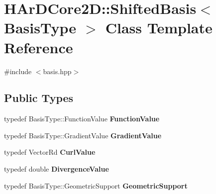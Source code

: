 \hypertarget{classHArDCore2D_1_1ShiftedBasis}{}\section{H\+Ar\+D\+Core2D\+:\+:Shifted\+Basis$<$ Basis\+Type $>$ Class Template Reference}
\label{classHArDCore2D_1_1ShiftedBasis}


{\ttfamily \#include $<$basis.\+hpp$>$}

\subsection*{Public Types}
\begin{DoxyCompactItemize}
\item 
\mbox{\label{classHArDCore2D_1_1ShiftedBasis_a723910be19a99d8ce0273b83b8f5e867}} 
typedef Basis\+Type\+::\+Function\+Value {\bfseries Function\+Value}
\item 
\mbox{\label{classHArDCore2D_1_1ShiftedBasis_a8c735f6905189f7c0e959a4758d9ff4b}} 
typedef Basis\+Type\+::\+Gradient\+Value {\bfseries Gradient\+Value}
\item 
\mbox{\label{classHArDCore2D_1_1ShiftedBasis_a406ca8b5e2b929b24a7ac1f0f717ff4a}} 
typedef Vector\+Rd {\bfseries Curl\+Value}
\item 
\mbox{\label{classHArDCore2D_1_1ShiftedBasis_a9555eb384f91b5a68a871632c839d9e3}} 
typedef double {\bfseries Divergence\+Value}
\item 
\mbox{\label{classHArDCore2D_1_1ShiftedBasis_a677eacf2bedba936109ffd1f43593a7b}} 
typedef Basis\+Type\+::\+Geometric\+Support {\bfseries Geometric\+Support}
\end{DoxyCompactItemize}
